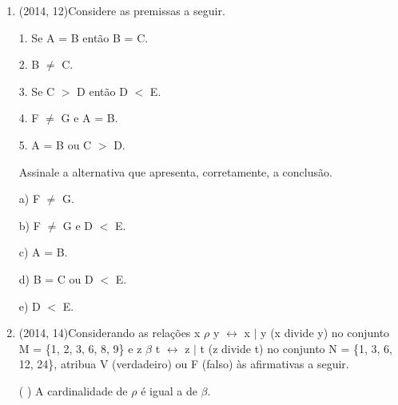 \documentclass{article}
\begin{document}
\begin{enumerate}
2. $b\lor(a \land (\sim a \lor \sim b))$ DM(Q)
 
3. $b\lor(a \land \sim a) \lor (a \land \sim b))$ DIS(2)

4. $b\lor(a \land \sim b)$ EN(3)

5. $(b\lor a) \land (b \lor \sim b)$ DIS(4)

6. $(b\lor a)$ EN(5) \newline

a) A or B\newline



\textbf{CONTEÚDO}

$\rule[1cm]{100cm}{1px}$

DeMorgan(DM) $\sim(\phi \wedge \psi) \equiv \sim \phi \vee \sim \psi$ 

distributiva(DIS) $\phi \wedge(\psi \vee \omega) \equiv(\psi \wedge \phi) \vee(\omega \wedge \phi)$

elemento neutro(EN) $\phi \wedge(\psi \vee \neg \psi) \equiv \phi$





\newpage




\item(2014, 12)Considere as premissas a seguir.

1. Se A = B então B = C.

2. B $\ne$ C.

3. Se C $>$ D então D $<$ E.

4. F $\ne$ G e A = B.

5. A = B ou C $>$ D.

Assinale a alternativa que apresenta, corretamente, a conclusão.

a) F $\ne$ G.

b) F $\ne$ G e D $<$ E.

c) A = B.

d) B = C ou D $<$ E.

e) D $<$ E.\newline






\item(2014, 14)Considerando as relações x $\rho$ y $\leftrightarrow$ x $|$ y (x divide y) no conjunto M = \{1, 2, 3, 6, 8, 9\} e z $\beta$ t $\leftrightarrow$ z $|$ t (z divide t) no conjunto N = \{1, 3, 6, 12, 24\}, atribua V (verdadeiro) ou F (falso) às afirmativas a seguir.

( ) A cardinalidade de $\rho$ é igual a de $\beta$.


\end{enumerate}
\end{document}
